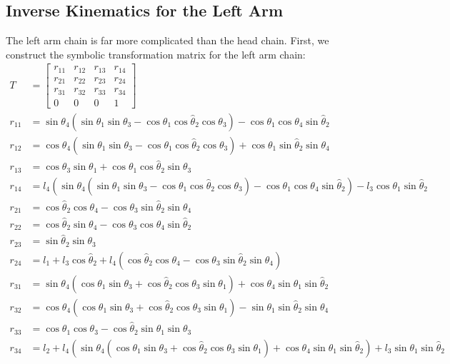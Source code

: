 \subsection{Inverse Kinematics for the Left Arm}
The left arm chain is far more complicated than the head chain. First, we construct the symbolic transformation matrix for the left arm chain:
\begin{align*}
T &= \begin{bmatrix}
r_{11} & r_{12} & r_{13} & r_{14}\\
r_{21} & r_{22} & r_{23} & r_{24}\\
r_{31} & r_{32} & r_{33} & r_{34}\\
0 & 0 & 0 & 1
\end{bmatrix}\\
r_{11} &= \sin\theta_4\left(\sin\theta_1\sin\theta_3 - \cos\theta_1\cos\widehat{\theta}_2\cos\theta_3\right) - \cos\theta_1\cos\theta_4\sin\widehat{\theta}_2\\
r_{12} &= \cos\theta_4\left(\sin\theta_1\sin\theta_3 - \cos\theta_1\cos\widehat{\theta}_2\cos\theta_3\right) + \cos\theta_1\sin\widehat{\theta}_2\sin\theta_4\\
r_{13} &= \cos\theta_3\sin\theta_1 + \cos\theta_1\cos\widehat{\theta}_2\sin\theta_3\\
r_{14} &= l_4\left(\sin\theta_4\left(\sin\theta_1\sin\theta_3 - \cos\theta_1\cos\widehat{\theta}_2\cos\theta_3\right) - \cos\theta_1\cos\theta_4\sin\widehat{\theta}_2\right) - l_3\cos\theta_1\sin\widehat{\theta}_2\\
r_{21} &= \cos\widehat{\theta}_2\cos\theta_4 - \cos\theta_3\sin\widehat{\theta}_2\sin\theta_4\\
r_{22} &= \cos\widehat{\theta}_2\sin\theta_4 - \cos\theta_3\cos\theta_4\sin\widehat{\theta}_2\\
r_{23} &= \sin\widehat{\theta}_2\sin\theta_3\\
r_{24} &= l_1 + l_3\cos\widehat{\theta}_2 + l_4\left(\cos\widehat{\theta}_2\cos\theta_4 - \cos\theta_3\sin\widehat{\theta}_2\sin\theta_4\right)\\
r_{31} &= \sin\theta_4\left(\cos\theta_1\sin\theta_3 + \cos\widehat{\theta}_2\cos\theta_3\sin\theta_1\right) + \cos\theta_4\sin\theta_1\sin\widehat{\theta}_2\\
r_{32} &= \cos\theta_4\left(\cos\theta_1\sin\theta_3 + \cos\widehat{\theta}_2\cos\theta_3\sin\theta_1\right) - \sin\theta_1\sin\widehat{\theta}_2\sin\theta_4\\
r_{33} &= \cos\theta_1\cos\theta_3 - \cos\widehat{\theta}_2\sin\theta_1\sin\theta_3\\
r_{34} &= l_2 + l_4\left(\sin\theta_4\left(\cos\theta_1\sin\theta_3 + \cos\widehat{\theta}_2\cos\theta_3\sin\theta_1\right) + \cos\theta_4\sin\theta_1\sin\widehat{\theta}_2\right) + l_3\sin\theta_1\sin\widehat{\theta}_2
\end{align*}
